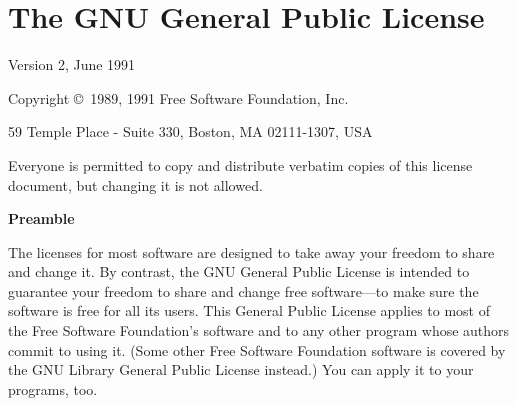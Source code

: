 \documentclass{article}
\begin{document}
\section{The GNU General Public License}


\begin{center}
{\parindent 0in

Version 2, June 1991

Copyright \copyright\ 1989, 1991 Free Software Foundation, Inc.

\bigskip

59 Temple Place - Suite 330, Boston, MA  02111-1307, USA

\bigskip

Everyone is permitted to copy and distribute verbatim copies
of this license document, but changing it is not allowed.
}
\end{center}

\begin{center}
{\bf\large Preamble}
\end{center}


The licenses for most software are designed to take away your freedom to
share and change it.  By contrast, the GNU General Public License is
intended to guarantee your freedom to share and change free software---to
make sure the software is free for all its users.  This General Public
License applies to most of the Free Software Foundation's software and to
any other program whose authors commit to using it.  (Some other Free
Software Foundation software is covered by the GNU Library General Public
License instead.)  You can apply it to your programs, too.
\end{document}
